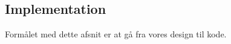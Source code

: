 \newpage
\subsection{Implementation}

Formålet med dette afsnit er at gå fra vores design til kode.
